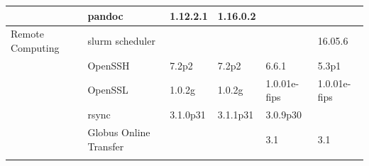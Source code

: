 \begin{table}[!ht]
{\begin{tabular}{ll|l|l|l|l|}
\cellcolor{white}                                                      & \multicolumn{1}{|l|}{pandoc}                 & 1.12.2.1                                                            & 1.16.0.2                                                          &                                                                        &                                                             \\ \hline
\cellcolor{white} Remote Computing                                     & \multicolumn{1}{|l|}{slurm scheduler}        &                                                                     &                                                                   &                                                                        & 16.05.6                                                     \\ \cline{2-6} \rowcolor{gray!25}
\cellcolor{white}                                                      & \multicolumn{1}{|l|}{OpenSSH}                & 7.2p2                                                               & 7.2p2                                                             & 6.6.1                                                                  & 5.3p1                                                       \\ \cline{2-6}
\cellcolor{white}                                                      & \multicolumn{1}{|l|}{OpenSSL}                & 1.0.2g                                                              & 1.0.2g                                                            & 1.0.01e-fips                                                           & 1.0.01e-fips                                                \\ \cline{2-6} \rowcolor{gray!25}
\cellcolor{white}                                                      & \multicolumn{1}{|l|}{rsync}                  & 3.1.0p31                                                            & 3.1.1p31                                                          & 3.0.9p30                                                               &                                                             \\ \cline{2-6}
\cellcolor{white}                                                      & \multicolumn{1}{|l|}{Globus Online Transfer} &                                                                     &                                                                   & 3.1                                                                    & 3.1                                                         \\ \cline{2-6} \rowcolor{gray!25}

\end{tabular}}
\end{table}
